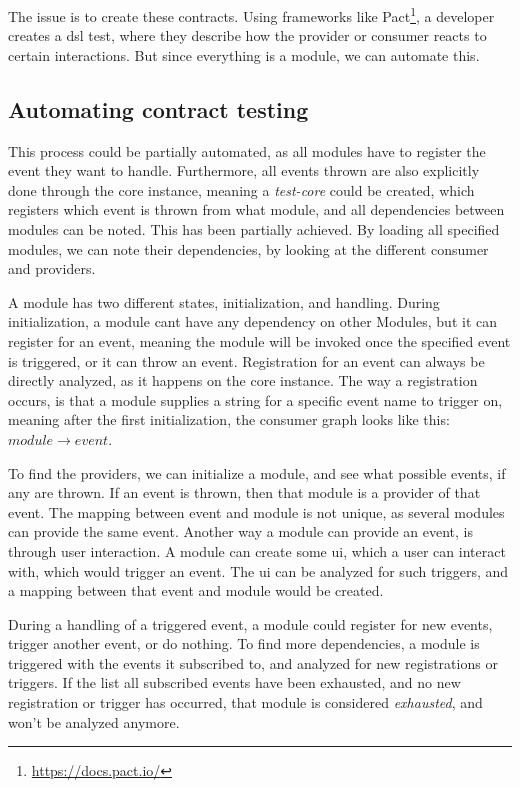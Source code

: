The issue is to create these contracts. Using frameworks like Pact\footnote{\url{https://docs.pact.io/}},
a developer creates a \gls*{dsl} test, where they describe how the provider or
consumer reacts to certain interactions. But since everything is a module, we
can automate this.

\subsection{Automating contract testing}

This process could be partially automated, as all modules have to register the
event they want to handle. Furthermore, all events thrown are also explicitly
done through the core instance, meaning a \textit{test-core} could be created,
which registers which event is thrown from what module, and all dependencies
between modules can be noted. This has been partially achieved. By loading all
specified modules, we can note their dependencies, by looking at the different
consumer and providers.

A module has two different states, initialization, and handling. During
initialization, a module cant have any dependency on other Modules, but it can
register for an event, meaning the module will be invoked once the specified
event is triggered, or it can throw an event. Registration for an event can
always be directly analyzed, as it happens on the core instance. The way a
registration occurs, is that a module supplies a string for a specific event
name to trigger on, meaning after the first initialization, the consumer graph
looks like this: $module \to event$.

To find the providers, we can initialize a module, and see what possible
events, if any are thrown. If an event is thrown, then that module is a
provider of that event. The mapping between event and module is not unique,
as several modules can provide the same event. Another way a module can
provide an event, is through user interaction. A module can create some
\gls*{ui}, which a user can interact with, which would trigger an event. The
\gls*{ui} can be analyzed for such triggers, and a mapping between that event and
module would be created.

During a handling of a triggered event, a module could register for new
events, trigger another event, or do nothing. To find more dependencies, a
module is triggered with the events it subscribed to, and analyzed for new
registrations or triggers. If the list all subscribed events have been
exhausted, and no new registration or trigger has occurred, that module is
considered \textit{exhausted}, and won't be analyzed anymore.

